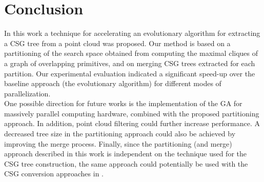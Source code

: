 \section{Conclusion}
\label{sec:conclusion}
In this work a technique for accelerating an evolutionary algorithm for extracting 
a \ac{CSG} tree from a point cloud was proposed. Our method is based on a partitioning of the search space obtained 
from computing the maximal cliques of a graph of overlapping primitives, and on merging \ac{CSG} trees 
extracted for each partition. 
Our experimental evaluation indicated a significant speed-up over the baseline approach (the evolutionary algorithm) for different modes of parallelization.
\\
One possible direction for future works is 
the implementation of the \ac{GA} for massively parallel computing hardware, combined with the proposed partitioning approach. 
In addition, point cloud filtering could further increase performance.
A decreased tree size in the partitioning approach could also be achieved by improving the merge process.
Finally, since the partitioning (and merge) approach described in this work is independent on the technique used for the CSG tree construction, the same approach could potentially be used with the CSG conversion approaches in \cite{shapiro1991construction,buchele2004three}. 

